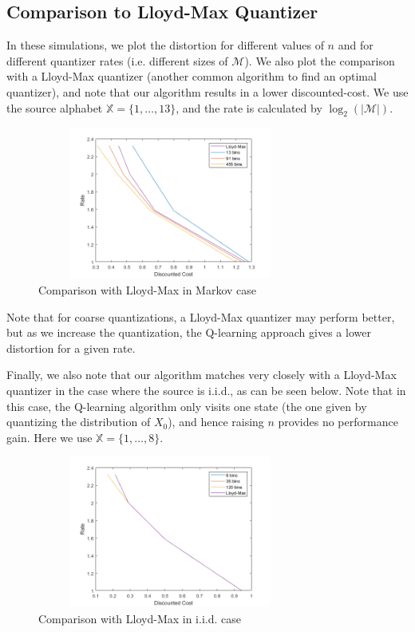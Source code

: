 \documentclass[conference, draftcls, onecolumn]{IEEEtran}
\begin{document}
\subsection{Comparison to Lloyd-Max Quantizer}
In these simulations, we plot the distortion for different values of \( n \) and for different quantizer rates (i.e. different sizes of \(\mathcal{M}\)). We also plot the comparison with a Lloyd-Max quantizer (another common algorithm to find an optimal quantizer), and note that our algorithm results in a lower discounted-cost. We use the source alphabet \( \mathbb{X} = \{1,\ldots,13\} \), and the rate is calculated by \(\log_2(|\mathcal{M}|)\).
\vspace{-1em}
\begin{figure}[H]
    \centering
    \includegraphics[height=5cm, width=8.75cm]{rate_distortion_lloydmax.png}
    \caption{Comparison with Lloyd-Max in Markov case}
\end{figure}

Note that for coarse quantizations, a Lloyd-Max quantizer may perform better, but as we increase the quantization, the Q-learning approach gives a lower distortion for a given rate.

Finally, we also note that our algorithm matches very closely with a Lloyd-Max quantizer in the case where the source is i.i.d., as can be seen below. Note that in this case, the Q-learning algorithm only visits one state (the one given by quantizing the distribution of \(X_0\)), and hence raising \(n\) provides no performance gain. Here we use \( \mathbb{X} = \{1,\ldots,8\} \).
\vspace{-1em}
\begin{figure}[H]
    \centering
    \includegraphics[height=5cm, width=8.75cm]{lloydmax_scalar.png}
    \caption{Comparison with Lloyd-Max in i.i.d. case}
\end{figure}
\end{document}
